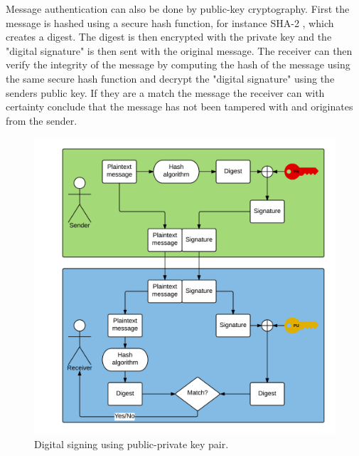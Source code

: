 Message authentication can also be done by public-key cryptography. First the message is hashed using a secure hash function, for instance SHA-2 \cite{shaRFC}, which creates a digest. The digest is then encrypted with the private key and the "digital signature" is then sent with the original message. The receiver can then verify the integrity of the message by computing the hash of the message using the same secure hash function and decrypt the "digital signature" using the senders public key. If they are a match the message the receiver can with certainty conclude that the message has not been tampered with and originates from the sender.

\begin{figure}[h!]
  \captionsetup{justification=centering,margin=1.5cm}
  \caption{Digital signing using public-private key pair.}
  \label{fig:signing_basic}
  \centering
    \includegraphics[width=1\textwidth]{images/signing_basic.png}
\end{figure}

